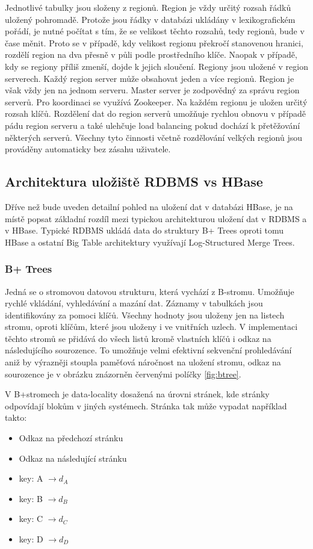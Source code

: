 \documentclass[thesis=M,czech]{FITthesis}[2012/06/26]
\begin{document}
Jednotlivé tabulky jsou složeny z regionů. Region je vždy určitý rozsah řádků uložený pohromadě. Protože jsou řádky v databázi ukládány v lexikografickém pořádí, je nutné počítat s tím, že se velikost těchto rozsahů, tedy regionů, bude v čase měnit. Proto se v případě, kdy velikost regionu překročí stanovenou hranici, rozdělí region na dva přesně v půli podle prostředního klíče. Naopak v případě, kdy se regiony příliš zmenší, dojde k jejich sloučení. Regiony jsou uložené v region serverech. Každý region server může obsahovat jeden a více regionů. Region je však vždy jen na jednom serveru. Master server je zodpovědný za správu region serverů. Pro koordinaci se využívá Zookeeper. Na každém regionu je uložen určitý rozsah klíčů. Rozdělení dat do region serverů umožňuje rychlou obnovu v případě pádu region serveru a také ulehčuje load balancing pokud dochází k přetěžování některých serverů. Všechny tyto činnosti včetně rozdělování velkých regionů jsou prováděny automaticky bez zásahu uživatele.

\subsection{Architektura uložiště RDBMS vs HBase}
Dříve než bude uveden detailní pohled na uložení dat v databázi HBase, je na místě popsat základní rozdíl mezi typickou architekturou uložení dat v RDBMS a v HBase. Typické RDBMS ukládá data do struktury B+ Trees oproti tomu HBase a ostatní Big Table architektury využívají Log-Structured Merge Trees\cite{hbase2011}.

\subsubsection{B+ Trees}
Jedná se o stromovou datovou strukturu, která vychází z B-stromu. Umožňuje rychlé vkládání, vyhledávání a mazání dat. Záznamy v tabulkách jsou identifikovány za pomoci klíčů. Všechny hodnoty jsou uloženy jen na listech stromu, oproti klíčům, které jsou uloženy i ve vnitřních uzlech. V implementaci těchto stromů se přidává do všech listů kromě vlastních klíčů i odkaz na následujícího sourozence.\cite{efi} To umožňuje velmi efektivní sekvenční prohledávání aniž by výrazněji stoupla paměťová náročnost na uložení stromu, odkaz na sourozence je v obrázku znázorněn červenými políčky \ref{fig:btree}. 

V B+stromech je data-locality dosažená na úrovni stránek, kde stránky odpovídají blokům v jiných systémech. Stránka tak může vypadat například takto:
\begin{itemize}
	\item Odkaz na předchozí stránku
	\item Odkaz na následující stránku
	\item key: A $\rightarrow d_A$
	\item key: B $\rightarrow d_B$
	\item key: C $\rightarrow d_C$
	\item key: D $\rightarrow d_D$
\end{itemize}
\end{document}
